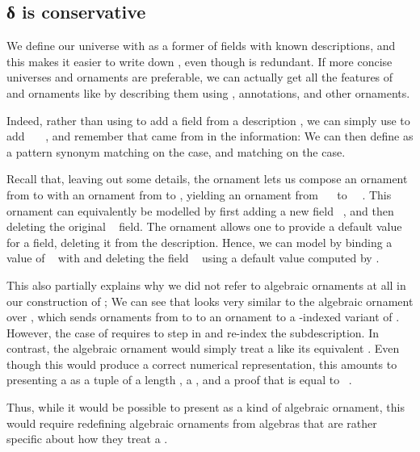 \subsection{δ is conservative}\label{sec:redundant-delta}
We define our universe  with  as a former of fields with known descriptions, and this makes it easier to write down , even though  is redundant. If more concise universes and ornaments are preferable, we can actually get all the features of  and ornaments like  by describing them using , annotations, and other ornaments.

Indeed, rather than using  to add a field from a description , we can simply use  to add \ \AV{=}\ \ , and remember that  came from  in the information:
We can then define  as a pattern synonym matching on the  case, and  matching on the  case.

Recall that, leaving out some details, the ornament  lets us compose an ornament from  to  with an ornament from  to , yielding an ornament from \ \  to \ \ . This ornament can equivalently be modelled by first adding a new field \ , and then deleting the original \  field. The ornament  \cite{kophd} allows one to provide a default value for a field, deleting it from the description. Hence, we can model  by binding a value  of \  with  and deleting the field \  using a default value computed by .

This also partially explains why we did not refer to algebraic ornaments at all in our construction of ; We can see that  looks very similar to the algebraic ornament over , which sends ornaments from  to  to an ornament to a -indexed variant of . However, the case of  requires  to step in and re-index the subdescription. In contrast, the algebraic ornament would simply treat a  like its equivalent . Even though this would produce a correct numerical representation, this amounts to presenting a  as a tuple of a length , a  , and a proof that  is equal to \ .

Thus, while it would be possible to present  as a kind of algebraic ornament, this would require redefining algebraic ornaments from algebras that are rather specific about how they treat a .


